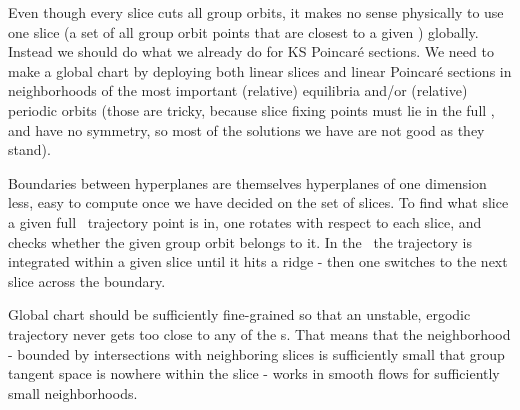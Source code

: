 Even though every slice cuts all group orbits, it makes no sense
physically to use one slice (a set of all group orbit points that are
closest to a given {\template}) globally. Instead we should do what we
already do for KS Poincar\'e sections. We need to make a global chart by
deploying both linear slices and linear Poincar\'e sections in
neighborhoods of the most important (relative) equilibria and/or
(relative) periodic orbits (those are tricky, because slice fixing points
must lie in the full \statesp, and have no symmetry, so most of the
solutions we have are not good as they stand).

Boundaries between hyperplanes are themselves hyperplanes of one
dimension less, easy to compute once we have decided on the set of
slices. To find what slice a given full \statesp\ trajectory point is in,
one rotates with respect to each slice, and checks whether the given
group orbit belongs to it. In the \reducedsp\ the trajectory is
integrated within a given slice until it hits a ridge - then one switches
to the next slice across the boundary.

Global chart should be sufficiently fine-grained so that an unstable,
ergodic trajectory never gets too close to any of the {\sset s}. That
means that the neighborhood - bounded by intersections with neighboring
slices is sufficiently small that group tangent space is nowhere within
the slice - works in smooth flows for sufficiently small neighborhoods.
